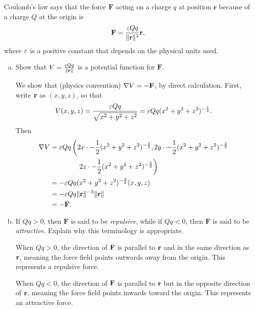 \begin{problem}
  Coulomb's law says that the force $\mathbf F$ acting on a charge $q$ at position $\mathbf r$ because of a charge $Q$ at the origin is
  \[\mathbf F=\frac{\varepsilon Qq}{\|\mathbf r\|^3}\mathbf r,\]
  where $\varepsilon$ is a positive constant that depends on the physical units used.
  \begin{enumerate}[(a)]
    \item Show that $V=\frac{\varepsilon Qq}{\|\mathbf r\|}$ is a potential function for $\mathbf F$.
    \begin{solution}
      We show that (physics convention) $\nabla V=-\mathbf F$, by direct calculation. First, write $\mathbf r$ as $(x,y,z)$, so that
      \[V(x,y,z)=\frac{\varepsilon Qq}{\sqrt{x^2+y^2+z^2}}=\varepsilon Qq(x^2+y^2+z^2)^{-\frac12}.\]
      Then
      \[\begin{split}
        \nabla V &= \varepsilon Qq \left(2x\cdot-\frac12(x^2+y^2+z^2)^{-\frac32},2y\cdot-\frac12(x^2+y^2+z^2)^{-\frac32}\right.\\
        &\qquad\qquad \left.2z\cdot-\frac12(x^2+y^2+z^2)^{-\frac32}\right)\\
        &= -\varepsilon Qq(x^2+y^2+z^2)^{-\frac32}(x,y,z)\\
        &= -\varepsilon Qq\|\mathbf r\|^{-3}\|\mathbf r\|\\
        &= -\mathbf F.
      \end{split}\]
    \end{solution}
    \item If $Qq>0$, then $\mathbf F$ is said to be \emph{repulsive}, while if $Qq<0$, then $\mathbf F$ is said to be \emph{attractive}. Explain why this terminology is appropriate.
    \begin{solution}
      When $Qq>0$, the direction of $\mathbf F$ is parallel to $\mathbf r$ and in the same direction as $\mathbf r$, meaning the force field points outwards away from the origin. This represents a repulsive force.

      When $Qq<0$, the direction of $\mathbf F$ is parallel to $\mathbf r$ but in the opposite direction of $\mathbf r$, meaning the force field points inwards toward the origin. This represents an attractive force.
    \end{solution}
  \end{enumerate}
\end{problem}

